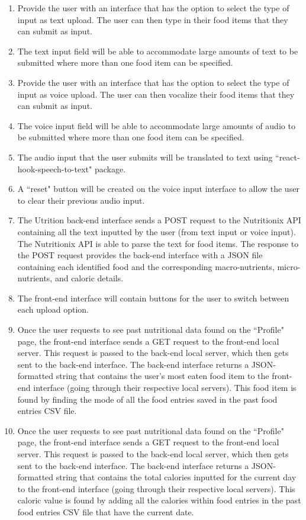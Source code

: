 \documentclass[12pt, titlepage]{article}
\begin{document}
\begin{enumerate}[{FR}1. ]
	\item Provide the user with an interface that has the option to select the type of input as text upload. The user can then type in their food items that they can submit as input.
	\item The text input field will be able to accommodate large amounts of text to be submitted where more than one food item can be specified.
	\item Provide the user with an interface that has the option to select the type of input as voice upload. The user can then vocalize their food items that they can submit as input.
	\item The voice input field will be able to accommodate large amounts of audio to be submitted where more than one food item can be specified.
	\item The audio input that the user submits will be translated to text using ``react-hook-speech-to-text" package.
	\item A ``reset" button will be created on the voice input interface to allow the user to clear their previous audio input.
	\item The Utrition back-end interface sends a POST request to the Nutritionix API containing all the text inputted by the user (from text input or voice input). The Nutritionix API is able to parse the text for food items. The response to the POST request provides the back-end interface with a JSON file containing each identified food and the corresponding macro-nutrients, micro-nutrients, and caloric details.
	\item The front-end interface will contain buttons for the user to switch between each upload option.
	\item Once the user requests to see past nutritional data found on the ``Profile" page, the front-end interface sends a GET request to the front-end local server. This request is passed to the back-end local server, which then gets sent to the back-end interface. The back-end interface returns a JSON-formatted string that contains the user's most eaten food item to the front-end interface (going through their respective local servers). This food item is found by finding the mode of all the food entries saved in the past food entries CSV file.
	\item Once the user requests to see past nutritional data found on the ``Profile" page, the front-end interface sends a GET request to the front-end local server. This request is passed to the back-end local server, which then gets sent to the back-end interface. The back-end interface returns a JSON-formatted string that contains the total calories inputted for the current day to the front-end interface (going through their respective local servers). This caloric value is found by adding all the calories within food entries in the past food entries CSV file that have the current date.

\end{enumerate}
\end{document}
